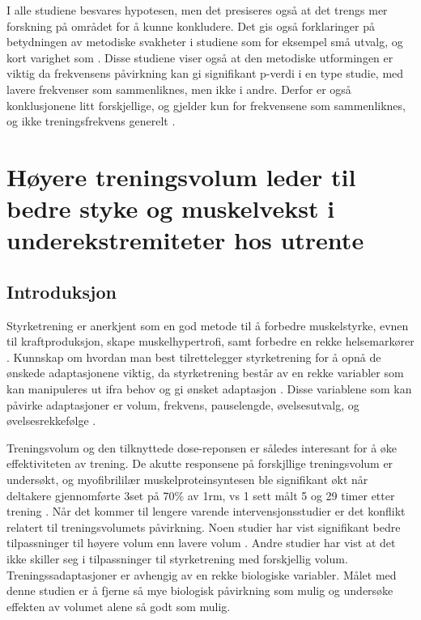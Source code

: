 \documentclass[
]{book}
\begin{document}
I alle studiene besvares hypotesen, men det presiseres også at det trengs mer forskning på området for å kunne konkludere. Det gis også forklaringer på betydningen av metodiske svakheter i studiene som for eksempel små utvalg, og kort varighet som . Disse studiene viser også at den metodiske utformingen er viktig da frekvensens påvirkning kan gi signifikant p-verdi i en type studie, med lavere frekvenser som sammenliknes, men ikke i andre. Derfor er også konklusjonene litt forskjellige, og gjelder kun for frekvensene som sammenliknes, og ikke treningsfrekvens generelt \citep{johnsen2021, brigatto2019, gentil2018, saric2019, lasevicius2019}.

\hypertarget{huxf8yere-treningsvolum-leder-til-bedre-styke-og-muskelvekst-i-underekstremiteter-hos-utrente}{%
\chapter{Høyere treningsvolum leder til bedre styke og muskelvekst i underekstremiteter hos utrente}\label{huxf8yere-treningsvolum-leder-til-bedre-styke-og-muskelvekst-i-underekstremiteter-hos-utrente}}

\hypertarget{introduksjon-1}{%
\section{Introduksjon}\label{introduksjon-1}}

Styrketrening er anerkjent som en god metode til å forbedre muskelstyrke, evnen til kraftproduksjon, skape muskelhypertrofi, samt forbedre en rekke helsemarkører \citep{kraemer2002}. Kunnskap om hvordan man best tilrettelegger styrketrening for å opnå de ønskede adaptasjonene viktig, da styrketrening består av en rekke variabler som kan manipuleres ut ifra behov og gi ønsket adaptasjon \citep{kraemer2004, bird2005}. Disse variablene som kan påvirke adaptasjoner er volum, frekvens, pauselengde, øvelsesutvalg, og øvelsesrekkefølge \citep{American2009}.

Treningsvolum og den tilknyttede dose-reponsen er således interesant for å øke effektiviteten av trening. De akutte responsene på forskjllige treningsvolum er undersøkt, og myofibrililær muskelproteinsyntesen ble signifikant økt når deltakere gjennomførte 3set på 70\% av 1rm, vs 1 sett målt 5 og 29 timer etter trening \citep{burd2010}. Når det kommer til lengere varende intervensjonsstudier er det konflikt relatert til treningsvolumets påvirkning. Noen studier har vist signifikant bedre tilpassninger til høyere volum enn lavere volum \citep[ ]{rønnestad2007, starkey1996, radaelli2015}. Andre studier har vist at det ikke skiller seg i tilpassninger til styrketrening med forskjellig volum\citep{bottaro2011, galvao2005, mcbride2003}. Treningssadaptasjoner er avhengig av en rekke biologiske variabler. Målet med denne studien er å fjerne så mye biologisk påvirkning som mulig og undersøke effekten av volumet alene så godt som mulig.
\end{document}
